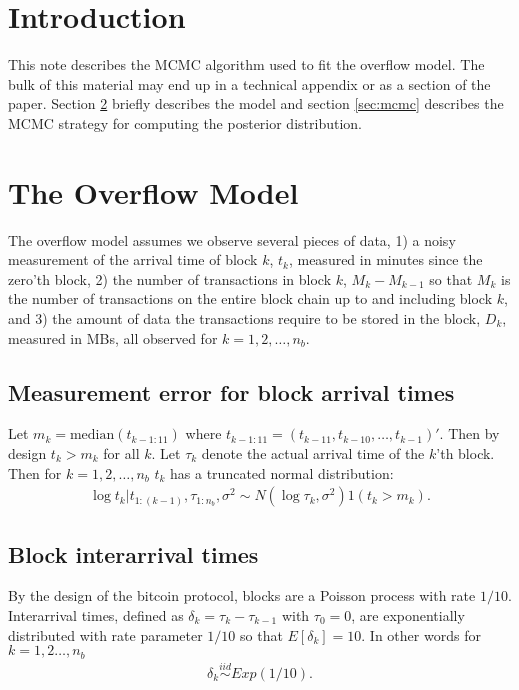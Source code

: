 \documentclass{article}
\begin{document}
\section{Introduction}
This note describes the MCMC algorithm used to fit the overflow model. The bulk of this material may end up in a technical appendix or as a section of the paper. Section \ref{sec:model} briefly describes the model and section \ref{sec:mcmc} describes the MCMC strategy for computing the posterior distribution.

\section{The Overflow Model}\label{sec:model}
The overflow model assumes we observe several pieces of data, 1) a noisy measurement of the arrival time of block $k$, $t_k$, measured in minutes since the zero'th block, 2) the number of transactions in block $k$, $M_k - M_{k-1}$ so that $M_k$ is the number of transactions on the entire block chain up to and including block $k$, and 3) the amount of data the transactions require to be stored in the block, $D_k$, measured in MBs, all observed for $k=1,2,\dots,n_{b}$.

\subsection{Measurement error for block arrival times}
Let $m_k = \mathrm{median}(t_{k - 1:11})$ where $t_{k-1:11} = (t_{k-11}, t_{k-10},\dots,t_{k-1})'$. Then by design $t_k > m_k$ for all $k$. Let $\tau_k$ denote the actual arrival time of the $k$'th block. Then for $k=1,2,\dots,n_{b}$ $t_k$ has a truncated normal distribution:
\begin{align*}
\log t_k |t_{1:(k-1)}, \tau_{1:n_{b}},\sigma^2 \sim N(\log\tau_k, \sigma^2)1(t_k > m_k).
\end{align*}

\subsection{Block interarrival times}
By the design of the bitcoin protocol, blocks are a Poisson process with rate $1/10$. Interarrival times, defined as $\delta_k = \tau_k - \tau_{k-1}$ with $\tau_0 = 0$, are exponentially distributed with rate parameter $1/10$ so that $E[\delta_k] = 10$. In other words for $k=1,2\dots,n_{b}$
\begin{align*}
\delta_k \stackrel{iid}{\sim} Exp(1/10).
\end{align*}
\end{document}
